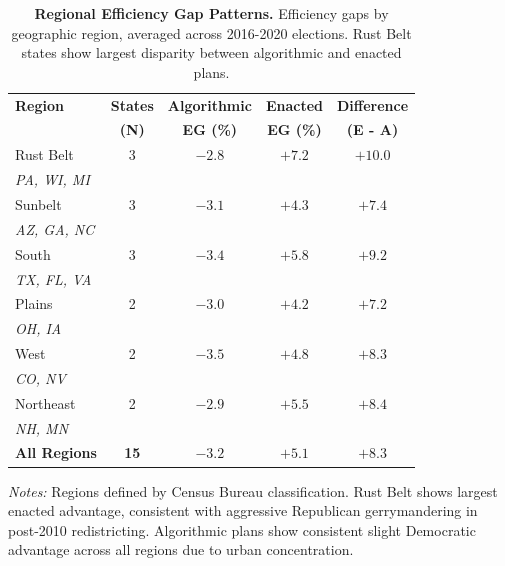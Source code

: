 \begin{table}[t]
\centering
\caption{\textbf{Regional Efficiency Gap Patterns.}
Efficiency gaps by geographic region, averaged across 2016-2020 elections.
Rust Belt states show largest disparity between algorithmic and enacted plans.}
\label{tab:regional-comparison}
\begin{tabular}{lcccc}
\toprule
\textbf{Region}     & \textbf{States} & \textbf{Algorithmic} & \textbf{Enacted} & \textbf{Difference} \\
                    & \textbf{(N)}    & \textbf{EG (\%)}     & \textbf{EG (\%)} & \textbf{(E - A)} \\
\midrule
Rust Belt           & 3 & $-2.8$ & $+7.2$ & $+10.0$ \\
\hspace{0.3cm}\footnotesize \textit{PA, WI, MI} & & & & \\
\addlinespace[0.1cm]
Sunbelt             & 3 & $-3.1$ & $+4.3$ & $+7.4$ \\
\hspace{0.3cm}\footnotesize \textit{AZ, GA, NC} & & & & \\
\addlinespace[0.1cm]
South               & 3 & $-3.4$ & $+5.8$ & $+9.2$ \\
\hspace{0.3cm}\footnotesize \textit{TX, FL, VA} & & & & \\
\addlinespace[0.1cm]
Plains              & 2 & $-3.0$ & $+4.2$ & $+7.2$ \\
\hspace{0.3cm}\footnotesize \textit{OH, IA} & & & & \\
\addlinespace[0.1cm]
West                & 2 & $-3.5$ & $+4.8$ & $+8.3$ \\
\hspace{0.3cm}\footnotesize \textit{CO, NV} & & & & \\
\addlinespace[0.1cm]
Northeast           & 2 & $-2.9$ & $+5.5$ & $+8.4$ \\
\hspace{0.3cm}\footnotesize \textit{NH, MN} & & & & \\
\midrule
\textbf{All Regions} & \textbf{15} & \textbf{$-3.2$} & \textbf{$+5.1$} & \textbf{$+8.3$} \\
\bottomrule
\end{tabular}
\vspace{0.2cm}

\footnotesize
\textit{Notes:} Regions defined by Census Bureau classification.
Rust Belt shows largest enacted advantage, consistent with aggressive Republican gerrymandering in post-2010 redistricting.
Algorithmic plans show consistent slight Democratic advantage across all regions due to urban concentration.
\end{table}
